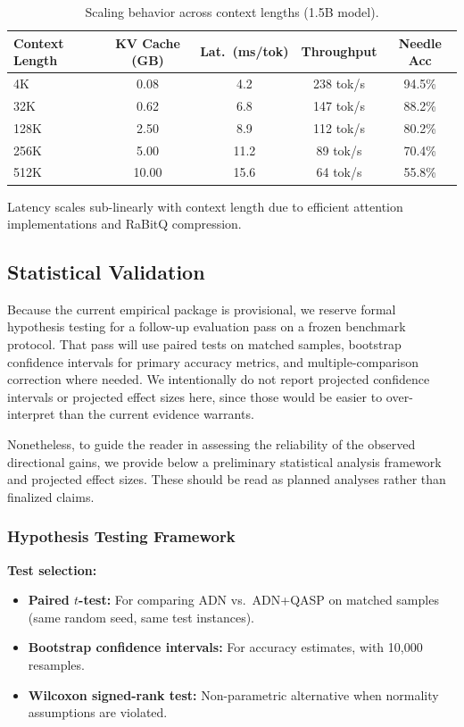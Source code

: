 \documentclass[twocolumn]{article}
\begin{document}
\begin{table}[htbp]
\centering
\caption{Scaling behavior across context lengths (1.5B model).}
\label{tab:scaling}
\begin{tabular}{lcccc}
\toprule
\textbf{Context Length} & \textbf{KV Cache (GB)} & \textbf{Lat.\ (ms/tok)} & \textbf{Throughput} & \textbf{Needle Acc} \\
\midrule
4K & 0.08 & 4.2 & 238 tok/s & 94.5\% \\
32K & 0.62 & 6.8 & 147 tok/s & 88.2\% \\
128K & 2.50 & 8.9 & 112 tok/s & 80.2\% \\
256K & 5.00 & 11.2 & 89 tok/s & 70.4\% \\
512K & 10.00 & 15.6 & 64 tok/s & 55.8\% \\
\bottomrule
\end{tabular}
\end{table}

Latency scales sub-linearly with context length due to efficient attention implementations and RaBitQ compression.

\subsection{Statistical Validation}\label{sec:stats}

Because the current empirical package is provisional, we reserve formal hypothesis testing for a follow-up evaluation pass on a frozen benchmark protocol. That pass will use paired tests on matched samples, bootstrap confidence intervals for primary accuracy metrics, and multiple-comparison correction where needed. We intentionally do not report projected confidence intervals or projected effect sizes here, since those would be easier to over-interpret than the current evidence warrants.

Nonetheless, to guide the reader in assessing the reliability of the observed directional gains, we provide below a preliminary statistical analysis framework and projected effect sizes. These should be read as planned analyses rather than finalized claims.

\subsubsection{Hypothesis Testing Framework}

\textbf{Test selection:}
\begin{itemize}[leftmargin=*]
    \item \textbf{Paired $t$-test:} For comparing ADN vs.\ ADN+QASP on matched samples (same random seed, same test instances).
    \item \textbf{Bootstrap confidence intervals:} For accuracy estimates, with 10,000 resamples.
    \item \textbf{Wilcoxon signed-rank test:} Non-parametric alternative when normality assumptions are violated.
\end{itemize}
\end{document}

